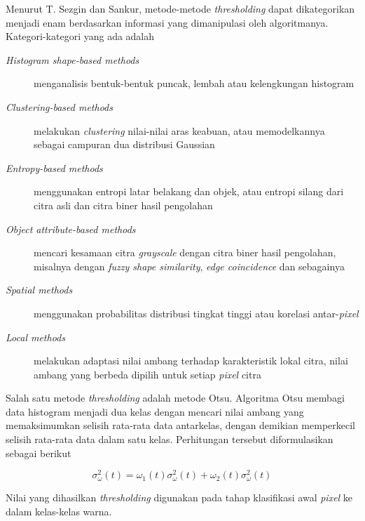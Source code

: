 \documentclass[laporan.tex]{subfiles}
\begin{document}
Menurut T. Sezgin dan Sankur\cite{sezgin}, metode-metode \emph{thresholding} dapat dikategorikan menjadi enam berdasarkan informasi yang dimanipulasi oleh algoritmanya. Kategori-kategori yang ada adalah

\begin{description}
\item[\emph{Histogram shape-based methods}] menganalisis bentuk-bentuk puncak, lembah atau kelengkungan histogram
\item[\emph{Clustering-based methods}] melakukan \emph{clustering} nilai-nilai aras keabuan, atau memodelkannya sebagai campuran dua distribusi Gaussian
\item[\emph{Entropy-based methods}] menggunakan entropi latar belakang dan objek, atau entropi silang dari citra asli dan citra biner hasil pengolahan
\item[\emph{Object attribute-based methods}] mencari kesamaan citra \emph{grayscale} dengan citra biner hasil pengolahan, misalnya dengan \emph{fuzzy shape similarity}, \emph{edge coincidence} dan sebagainya
\item[\emph{Spatial methods}] menggunakan probabilitas distribusi tingkat tinggi atau korelasi antar-\emph{pixel}
\item[\emph{Local methods}] melakukan adaptasi nilai ambang terhadap karakteristik lokal citra, nilai ambang yang berbeda dipilih untuk setiap \emph{pixel} citra
\end{description}

Salah satu metode \emph{thresholding} adalah metode Otsu. Algoritma Otsu membagi data histogram menjadi dua kelas dengan mencari nilai ambang yang memaksimumkan selisih rata-rata data antarkelas, dengan demikian memperkecil selisih rata-rata data dalam satu kelas. Perhitungan tersebut diformulasikan sebagai berikut

\begin{equation}
	\sigma_{\omega}^2 (t) = \omega_1 (t) \sigma_{\omega}^2 (t) + \omega_2 (t) \sigma_{\omega}^2 (t)
\end{equation}

Nilai yang dihasilkan \emph{thresholding} digunakan pada tahap klasifikasi awal \emph{pixel} ke dalam kelas-kelas warna.
\end{document}
